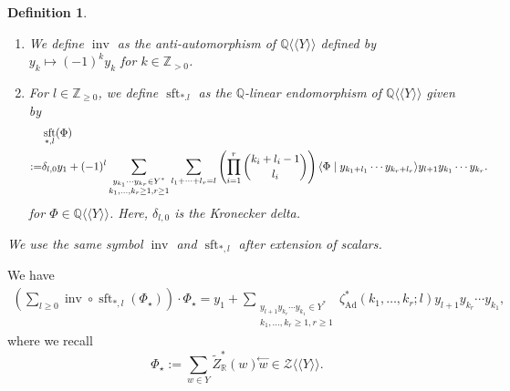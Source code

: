 \documentclass[15pt,oneside,reqno]{amsart}
\newcounter{dfcounter}
\newtheorem{df}{Definition}[dfcounter]
\theoremstyle{remark}{
\newtheorem{lem}[df]{Lemma}
\newtheorem{prop}[df]{Proposition}
\newtheorem{ex}[df]{Example}
\newtheorem{rmk}[df]{Remark}
}
\newcommand{\Q}{\mathbb{Q}}
\DeclareMathOperator{\inv}{inv}
\newcommand{\hAdmzv}[2]{\zeta_{\mathrm{Ad}}^{*}(#1;#2)}
\DeclareMathOperator{\sft}{sft}
\begin{document}
\begin{df}
\begin{enumerate}
\item We define $\inv$ as the anti-automorphism of $\Q\langle\!\langle Y \rangle\!\rangle$ defined by $y_k \mapsto (-1)^k y_k$ for $k\in\mathbb{Z}_{>0}$.
\item
For $l \in \mathbb{Z}_{\ge 0}$, we define $\sft_{*.l}$ as the $\Q$-linear endomorphism of $\Q\langle\langle Y \rangle\rangle$ given by
{\small
\begin{align}
&\sft_{*,l}(\Phi) \notag \\
:=&\delta_{l,0}y_1 + (-1)^l \sum_{\substack{y_{k_1}\cdots y_{k_r} \in Y^* \\ k_1,\ldots,k_r\ge 1, r\ge 1}}\sum_{l_1+\cdots +l_r = l}\left(\prod_{i = 1}^r \binom{k_i + l_i -1}{l_i} \right)\langle\Phi \mid y_{k_1+l_1}\cdots y_{k_r+l_r} \rangle y_{l+1}y_{k_1}\cdots y_{k_r}. \label{eq:sft-l}
\end{align}
}
for $\Phi \in \Q\langle \langle Y \rangle\rangle$.
Here, $\delta_{l,0}$ is the Kronecker delta.
\end{enumerate}
We use the same symbol $\inv$ and $\sft_{*,l}$ after extension of scalars.
\end{df}
\begin{prop}\label{prop:Ad-har-exp}
We have
\begin{align*}
 \left(\sum_{l\ge 0} \inv\circ \sft_{*,l} (\Phi_{\star}) \right)\cdot \Phi_{\star} = y_1 + \sum_{\substack{y_{l+1}y_{k_r}\cdots y_{k_1} \in Y^* \\ k_1,\ldots,k_r\ge 1,  r\ge 1}}\hAdmzv{k_1,\ldots,k_r}{l}y_{l+1}y_{k_r}\cdots y_{k_1},
\end{align*}
where we recall 
\[
\Phi_{\star} := \sum_{w\in Y} \widetilde{Z}_{\mathbb{R}}^{*}(w) \overset{\leftarrow}{w} \in \mathcal{Z} \langle \langle Y \rangle\rangle.
\] 
\end{prop}
\end{document}

